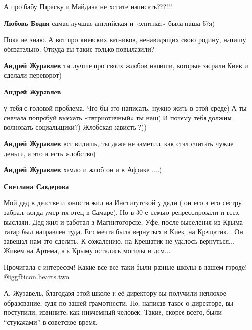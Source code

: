 \begin{itemize}
А про бабу Параску и Майдана не хотите написать???!!!

\begin{itemize} %
\textbf{Любовь Бодня} самая лучшая английская и «элитная» была наша 57я)


Пока не знаю. А вот про киевских ватников, ненавидящих свою родину, напишу
обязательно. Откуда вы такие только повылазили?

\begin{itemize} %
\textbf{Андрей Журавлев} ты лучше про своих жлобов напиши, которые засрали Киев и сделали переворот)

\textbf{Андрей Журавлев} 

у тебя с головой проблема. Что бы это написать, нужно жить в этой среде) А ты
сначала попробуй выехать «патриотичный» ты наш) И почему тебя должны волновать
социальщики?) Жлобская зависть ?))


\textbf{Андрей Журавлев} вот видишь, ты даже не заметил, как стал считать чужие деньги, а это и есть жлобство)

\textbf{Андрей Журавлев} хамло и жлоб он и в Африке ....)
\end{itemize} %

\textbf{Светлана Савдерова} 

Мой дед в детстве и юности жил на Институтской у дяди ( он его и его сестру
забрал, когда умер их отец в Самаре). Но в 30-е семью репрессировали и всех
выслали. Дед жил и работал в Магнитогорске, Уфе, после выселения из Крыма татар
был направлен туда. Его мечта была вернуться в Киев, на Крещатик... Он завещал нам
это сделать. К сожалению, на Крещатик не удалось вернуться... Живем на Артема, а в
Крыму остались могилы и дом...

\end{itemize} %

Прочитала с интересом! Какие все все-таки были разные школы в нашем городе! @igg{fbicon.hearts.two} 


А. Журавель, благодаря этой школе и её директору вы получили неплохое
образование, судя по вашей грамотности. Но, написав такое о директоре, вы
поступили, извините, как никчемный человек. Такие, скорее всего, были
\enquote{стукачами} в советское время.


\end{itemize}
